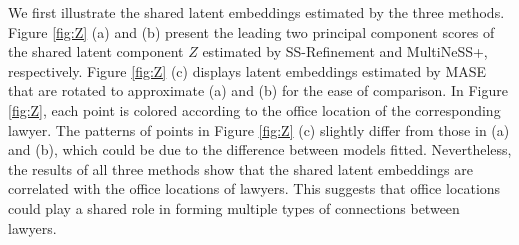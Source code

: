 \documentclass[12pt]{article}
\newcommand{\blue}[1]{\textcolor{blue}{#1}}
\begin{document}
 We first illustrate the 
 shared latent embeddings estimated by the three methods. 
Figure \ref{fig:Z} (a) and (b) present  the leading two principal component scores of the shared latent component $Z$ estimated 
by SS-Refinement and MultiNeSS+, respectively. 
 Figure \ref{fig:Z} (c) displays latent embeddings estimated by MASE that are rotated to approximate (a) and (b) for the ease of comparison. 
In Figure \ref{fig:Z}, each point is colored according to the office location of the corresponding  lawyer.  
The patterns of points in Figure \ref{fig:Z} (c) slightly differ from those in (a) and (b), which could be due to the difference between models fitted.  
Nevertheless, the results of all three methods show that the shared latent embeddings are correlated with the office locations of lawyers. 
This  suggests that office locations could play a shared role in forming multiple types of connections between lawyers.  



\end{document}
